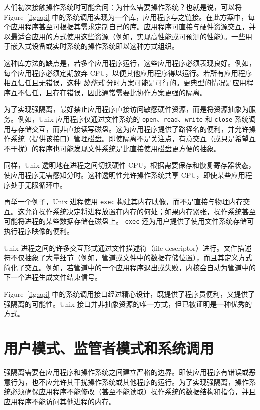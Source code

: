 人们初次接触操作系统时可能会问：为什么需要操作系统？也就是说，可以将 Figure~\ref{fig:api} 中的系统调用实现为一个库，应用程序与之链接。在此方案中，每个应用程序甚至可根据其需求定制自己的库。应用程序可直接与硬件资源交互，并以最适合应用的方式使用这些资源（例如，实现高性能或可预测的性能）。一些用于嵌入式设备或实时系统的操作系统即以这种方式组织。

这种库方法的缺点是，若多个应用程序运行，这些应用程序必须表现良好。例如，每个应用程序必须定期放弃 CPU，以便其他应用程序得以运行。若所有应用程序相互信任且无错误，这种 \textit{协作式} 分时方案可能是可行的。更典型的情况是应用程序互不信任，且存在错误，因此通常需要比协作方案更强的隔离。

为了实现强隔离，最好禁止应用程序直接访问敏感硬件资源，而是将资源抽象为服务。例如，Unix 应用程序仅通过文件系统的 \lstinline{open}、\lstinline{read}、\lstinline{write} 和 \lstinline{close} 系统调用与存储交互，而非直接读写磁盘。这为应用程序提供了路径名的便利，并允许操作系统（提供该接口）管理磁盘。即使隔离不是关注点，有意交互（或只是希望互不干扰）的程序也可能发现文件系统是比直接使用磁盘更方便的抽象。

同样，Unix 透明地在进程之间切换硬件 CPU，根据需要保存和恢复寄存器状态，使应用程序无需感知分时。这种透明性允许操作系统共享 CPU，即使某些应用程序处于无限循环中。

再举一个例子，Unix 进程使用
\lstinline{exec}
构建其内存映像，而不是直接与物理内存交互。这允许操作系统决定将进程放置在内存的何处；如果内存紧张，操作系统甚至可能将进程的某些数据存储在磁盘上。
\lstinline{exec}
还为用户提供了使用文件系统存储可执行程序映像的便利。

Unix 进程之间的许多交互形式通过文件描述符（file descriptor）进行。文件描述符不仅抽象了大量细节（例如，管道或文件中的数据存储位置），而且其定义方式简化了交互。例如，若管道中的一个应用程序退出或失败，内核会自动为管道中的下一个进程生成文件结束信号。

Figure~\ref{fig:api}
中的系统调用接口经过精心设计，既提供了程序员便利，又提供了强隔离的可能性。Unix 接口并非抽象资源的唯一方式，但已被证明是一种优秀的方式。

\section{用户模式、监管者模式和系统调用}

强隔离需要在应用程序和操作系统之间建立严格的边界。即使应用程序有错误或恶意行为，也不应允许其干扰操作系统或其他程序的运行。为了实现强隔离，操作系统必须确保应用程序不能修改（甚至不能读取）操作系统的数据结构和指令，并且应用程序不能访问其他进程的内存。

